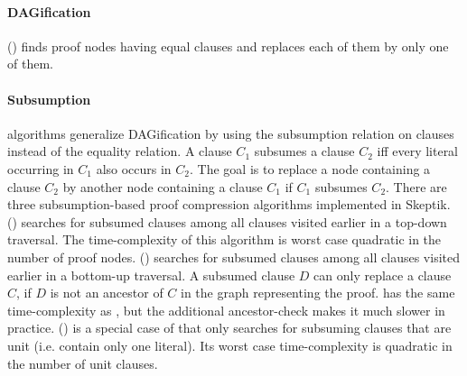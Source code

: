 \documentclass{llncs}
\begin{document}
\paragraph{DAGification} () finds proof nodes having equal clauses and replaces each of them by only one of them. 


\paragraph{Subsumption} algorithms generalize DAGification by using the subsumption relation on clauses instead of the equality relation. A clause $C_1$ subsumes a clause $C_2$ iff every literal occurring in $C_1$ also occurs in $C_2$. The goal is to replace a node containing a clause $C_2$ by another node containing a clause $C_1$ if $C_1$ subsumes $C_2$.
There are three subsumption-based proof compression algorithms implemented in Skeptik. 
%
 () searches for subsumed clauses among all clauses visited earlier in a top-down traversal. The time-complexity of this algorithm is worst case quadratic in the number of proof nodes.
%
 () searches for subsumed clauses among all clauses visited earlier in a bottom-up traversal. A subsumed clause $D$ can only replace a clause $C$, if $D$ is not an ancestor of $C$ in the graph representing the proof.  has the same time-complexity as , but the additional ancestor-check makes it much slower in practice.
%
 () \cite{RP11} is a special case of  that only searches for subsuming clauses that are unit (i.e. contain only one literal). Its worst case time-complexity is quadratic in the number of unit clauses.
\end{document}
